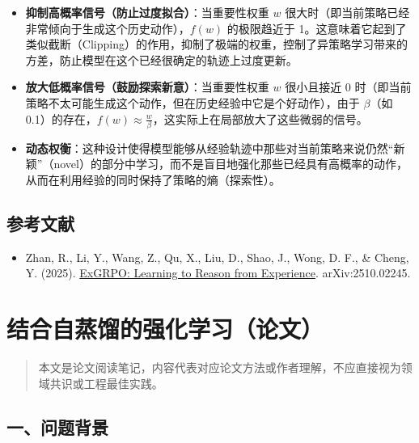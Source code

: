 \begin{itemize}
\tightlist
\item
  \textbf{抑制高概率信号（防止过度拟合）}：当重要性权重 \(w\) 很大时（即当前策略已经非常倾向于生成这个历史动作），\(f(w)\) 的极限趋近于 1。这意味着它起到了类似截断（Clipping）的作用，抑制了极端的权重，控制了异策略学习带来的方差，防止模型在这个已经很确定的轨迹上过度更新。
\item
  \textbf{放大低概率信号（鼓励探索新意）}：当重要性权重 \(w\) 很小且接近 0 时（即当前策略不太可能生成这个动作，但在历史经验中它是个好动作），由于 \(\beta\)（如 0.1）的存在，\(f(w)\approx\frac{w}{\beta}\)，这实际上在局部放大了这些微弱的信号。
\item
  \textbf{动态权衡}：这种设计使得模型能够从经验轨迹中那些对当前策略来说仍然``新颖''（novel）的部分中学习，而不是盲目地强化那些已经具有高概率的动作，从而在利用经验的同时保持了策略的熵（探索性）。
\end{itemize}

\hypertarget{ux53c2ux8003ux6587ux732e-113}{%
\subsection{参考文献}\label{ux53c2ux8003ux6587ux732e-113}}

\begin{itemize}
\tightlist
\item
  Zhan, R., Li, Y., Wang, Z., Qu, X., Liu, D., Shao, J., Wong, D. F., \& Cheng, Y. (2025). \href{https://arxiv.org/abs/2510.02245}{ExGRPO: Learning to Reason from Experience}. arXiv:2510.02245.
\end{itemize}

\clearpage

\hypertarget{ux7ed3ux5408ux81eaux84b8ux998fux7684ux5f3aux5316ux5b66ux4e60ux8bbaux6587}{%
\section{结合自蒸馏的强化学习（论文）}\label{ux7ed3ux5408ux81eaux84b8ux998fux7684ux5f3aux5316ux5b66ux4e60ux8bbaux6587}}

\begin{quote}
本文是论文阅读笔记，内容代表对应论文方法或作者理解，不应直接视为领域共识或工程最佳实践。
\end{quote}

\hypertarget{ux4e00ux95eeux9898ux80ccux666f-2}{%
\subsection{一、问题背景}\label{ux4e00ux95eeux9898ux80ccux666f-2}}

